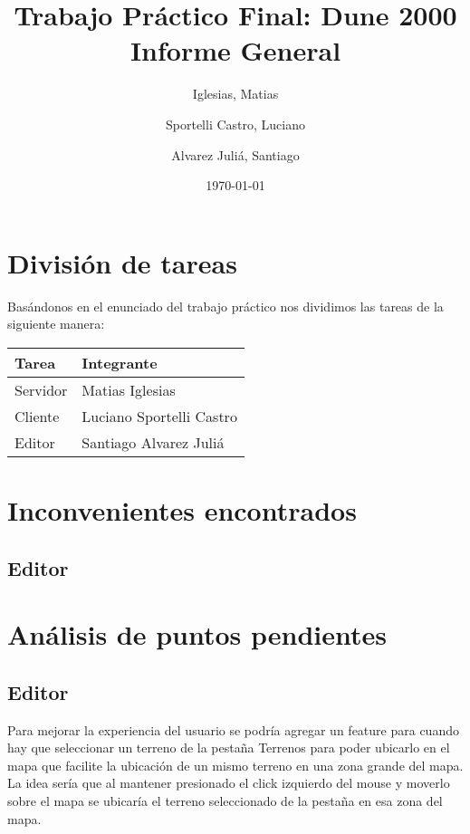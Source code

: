 \documentclass[titlepage,a4paper,12pt]{article}
\title{ Trabajo Práctico Final: Dune 2000 \\
 \large{Informe General}}
\author{Iglesias, Matias \and Sportelli Castro, Luciano \and Alvarez Juliá, Santiago}
\date{ \today }
\begin{document}
\maketitle

\tableofcontents %

\newpage
\section{División de tareas}

Basándonos en el enunciado del trabajo práctico nos dividimos las tareas de la siguiente manera:\\

\begin{center}
    \begin{tabular}{ | l | l |}
    \hline
    Tarea & Integrante \\ \hline
    Servidor & Matias Iglesias  \\ \hline
    Cliente & Luciano Sportelli Castro \\ \hline
    Editor & Santiago Alvarez Juliá\\
    \hline
    \end{tabular}
\end{center}

\section{Inconvenientes encontrados}

\subsection{Editor}



\section{Análisis de puntos pendientes}

\subsection{Editor} 

Para mejorar la experiencia del usuario se podría agregar un feature para cuando hay que seleccionar un terreno de la pestaña Terrenos para poder ubicarlo en el mapa que facilite la ubicación de un mismo terreno en una zona grande del mapa. La idea sería que al mantener presionado el click izquierdo del mouse y moverlo sobre el mapa se ubicaría el terreno seleccionado de la pestaña en esa zona del mapa.\\
\end{document}
